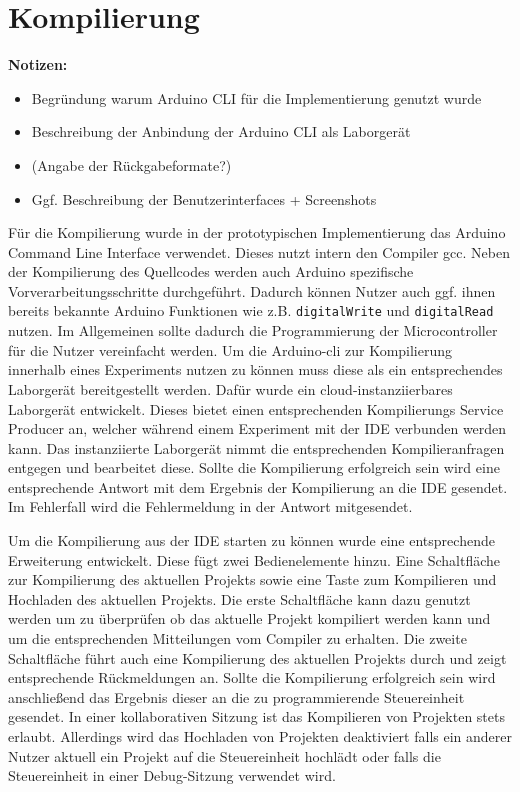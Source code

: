 \section{Kompilierung}\label{section:prototypische-implementierung:kompilierung}

\begin{note}
    \textbf{Notizen:}
    \begin{itemize}
        \item Begründung warum Arduino CLI für die Implementierung genutzt wurde
        \item Beschreibung der Anbindung der Arduino CLI als Laborgerät
        \item (Angabe der Rückgabeformate?)
        \item Ggf. Beschreibung der Benutzerinterfaces + Screenshots
    \end{itemize}
\end{note}

Für die Kompilierung wurde in der prototypischen Implementierung das Arduino Command Line Interface  verwendet. Dieses nutzt intern den Compiler gcc. Neben der Kompilierung des Quellcodes werden auch Arduino spezifische Vorverarbeitungsschritte durchgeführt. Dadurch können Nutzer auch ggf. ihnen bereits bekannte Arduino Funktionen wie z.B. \texttt{digitalWrite} und \texttt{digitalRead} nutzen. Im Allgemeinen sollte dadurch die Programmierung der Microcontroller für die Nutzer vereinfacht werden. Um die Arduino-cli zur Kompilierung innerhalb eines Experiments nutzen zu können muss diese als ein entsprechendes Laborgerät bereitgestellt werden. Dafür wurde ein cloud-instanziierbares Laborgerät entwickelt. Dieses bietet einen entsprechenden Kompilierungs Service Producer an, welcher während einem Experiment mit der IDE verbunden werden kann. Das instanziierte Laborgerät nimmt die entsprechenden Kompilieranfragen entgegen und bearbeitet diese. Sollte die Kompilierung erfolgreich sein wird eine entsprechende Antwort mit dem Ergebnis der Kompilierung an die IDE gesendet. Im Fehlerfall wird die Fehlermeldung in der Antwort mitgesendet.

Um die Kompilierung aus der IDE starten zu können wurde eine entsprechende Erweiterung entwickelt. Diese fügt zwei Bedienelemente hinzu. Eine Schaltfläche zur Kompilierung des aktuellen Projekts sowie eine Taste zum Kompilieren und Hochladen des aktuellen Projekts. Die erste Schaltfläche kann dazu genutzt werden um zu überprüfen ob das aktuelle Projekt kompiliert werden kann und um die entsprechenden Mitteilungen vom Compiler zu erhalten. Die zweite Schaltfläche führt auch eine Kompilierung des aktuellen Projekts durch und zeigt entsprechende Rückmeldungen an. Sollte die Kompilierung erfolgreich sein wird anschließend das Ergebnis dieser an die zu programmierende Steuereinheit gesendet. In einer kollaborativen Sitzung ist das Kompilieren von Projekten stets erlaubt. Allerdings wird das Hochladen von Projekten deaktiviert falls ein anderer Nutzer aktuell ein Projekt auf die Steuereinheit hochlädt oder falls die Steuereinheit in einer Debug-Sitzung verwendet wird.